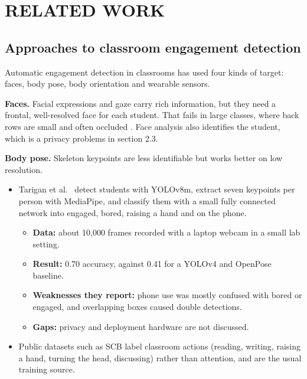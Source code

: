\chapter{RELATED WORK}

\section{Approaches to classroom engagement detection}

Automatic engagement detection in classrooms has used four kinds of target: faces, body pose, body orientation and wearable sensors.

\textbf{Faces.} Facial expressions and gaze carry rich information, but they need a frontal, well-resolved face for each student. That fails in large classes, where back rows are small and often occluded \cite{b1}. Face analysis also identifies the student, which is a privacy problems in section 2.3.

\textbf{Body pose.} Skeleton keypoints are less identifiable but works better on low resolution.

\begin{itemize}
\tightlist
\item
  Tarigan et al.~\cite{b2} detect students with YOLOv8m, extract seven keypoints per person with MediaPipe, and classify them with a small fully connected network into engaged, bored, raising a hand and on the phone.

  \begin{itemize}
  \tightlist
  \item
    \textbf{Data:} about 10,000 frames recorded with a laptop webcam in a small lab setting.
  \item
    \textbf{Result:} 0.70 accuracy, against 0.41 for a YOLOv4 and OpenPose baseline.
  \item
    \textbf{Weaknesses they report:} phone use was mostly confused with bored or engaged, and overlapping boxes caused double detections.
  \item
    \textbf{Gaps:} privacy and deployment hardware are not discussed.
  \end{itemize}
\item
  Public datasets such as SCB \cite{b3} label classroom actions (reading, writing, raising a hand, turning the head, discussing) rather than attention, and are the usual training source.
\end{itemize}

